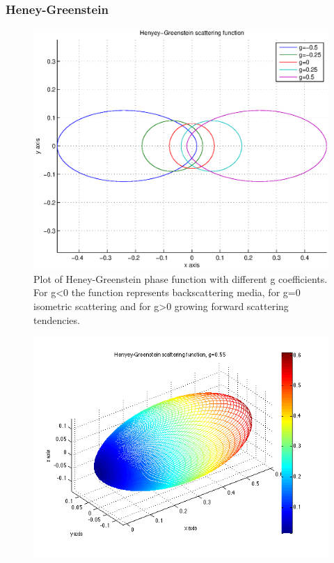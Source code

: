 \subsubsection{Heney-Greenstein}
\begin{minipage}{\linewidth}
      \begin{minipage}{0.45\linewidth}
          \begin{figure}[H]
              \includegraphics[width=\linewidth]{02_Chap2/Figures/heneygreenstein2dgraph}
              \captionsetup{width=\linewidth}
              \caption[2D plot of Plot of Heney-Greenstein phase function.]{Plot of Heney-Greenstein phase function with different g coefficients. For g\textless0 the function represents backscattering media, for g=0 isometric scattering and for g\textgreater0 growing forward scattering tendencies.}\label{fig:HG2}
          \end{figure}
      \end{minipage}
      \hspace{0.05\linewidth}
      \begin{minipage}{0.45\linewidth}
          \begin{figure}[H]
              \includegraphics[width=\linewidth]{images/hg3d}

\end{figure}
\end{minipage}
\end{minipage}
